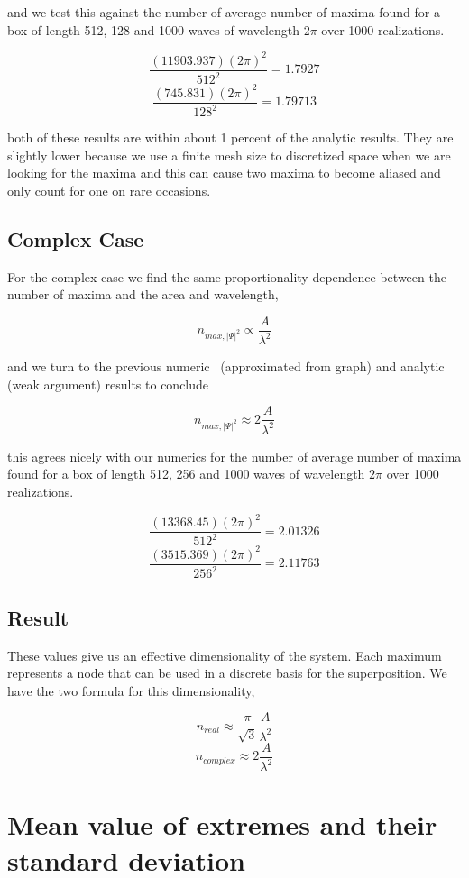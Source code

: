 \documentclass[12pt]{article}
\begin{document}
and we test this against the number of average number of maxima found for a box of length 512, 128 and 1000 waves of wavelength $2\pi$ over 1000 realizations.

\[\frac{(11903.937)(2\pi)^{2}}{512^{2}} = 1.7927\]
\[\frac{(745.831)(2\pi)^{2}}{128^{2}} = 1.79713\]

both of these results are within about 1 percent of the analytic results. They are slightly lower because we use a finite mesh size to discretized space when we are looking for the maxima and this can cause two maxima to become aliased and only count for one on rare occasions.

\subsection{Complex Case}

For the complex case we find the same proportionality dependence between the number of maxima and the area and wavelength,

\[n_{max,|\Psi|^{2}} \propto \frac{A}{\lambda^{2}}\]

and we turn to the previous numeric~\cite{AW75} (approximated from graph) and analytic~\cite{RA98} (weak argument) results to conclude

\[n_{max,|\Psi|^{2}} \approx 2 \frac{A}{\lambda^{2}}\]

this agrees nicely with our numerics for the number of average number of maxima found for a box of length 512, 256 and 1000 waves of wavelength $2\pi$ over 1000 realizations.

\[\frac{(13368.45)(2\pi)^{2}}{512^{2}} = 2.01326\]
\[\frac{(3515.369)(2\pi)^{2}}{256^{2}} = 2.11763\]

\subsection{Result}

These values give us an effective dimensionality of the system. Each maximum represents a node that can be used in a discrete basis for the superposition. We have the two formula for this dimensionality,

\[n_{real} \approx \frac{\pi}{\sqrt{3}} \frac{A}{\lambda^{2}}\]
\[n_{complex} \approx 2 \frac{A}{\lambda^{2}}\]

\section{Mean value of extremes and their standard deviation}
\end{document}
